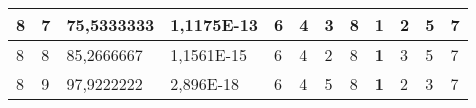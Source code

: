 \documentclass[conference]{IEEEtran}
\begin{document}
\begin{table*}[]
\begin{tabular}{|llll|llllllll|}
\multicolumn{1}{|l|}{8}                                                     & \multicolumn{1}{l|}{7}                                                        & \multicolumn{1}{l|}{75,5333333}                                                   & 1,1175E-13                     & \multicolumn{1}{l|}{6}                                                  & \multicolumn{1}{l|}{4}                                                  & \multicolumn{1}{l|}{3}                                                  & \multicolumn{1}{l|}{8}                                                  & \multicolumn{1}{l|}{\textbf{1}}                                         & \multicolumn{1}{l|}{2}                                                  & \multicolumn{1}{l|}{5}                                                  & 7                          \\ \hline
\multicolumn{1}{|l|}{8}                                                     & \multicolumn{1}{l|}{8}                                                        & \multicolumn{1}{l|}{85,2666667}                                                   & 1,1561E-15                     & \multicolumn{1}{l|}{6}                                                  & \multicolumn{1}{l|}{4}                                                  & \multicolumn{1}{l|}{2}                                                  & \multicolumn{1}{l|}{8}                                                  & \multicolumn{1}{l|}{\textbf{1}}                                         & \multicolumn{1}{l|}{3}                                                  & \multicolumn{1}{l|}{5}                                                  & 7                          \\ \hline
\multicolumn{1}{|l|}{8}                                                     & \multicolumn{1}{l|}{9}                                                        & \multicolumn{1}{l|}{97,9222222}                                                   & 2,896E-18                      & \multicolumn{1}{l|}{6}                                                  & \multicolumn{1}{l|}{4}                                                  & \multicolumn{1}{l|}{5}                                                  & \multicolumn{1}{l|}{8}                                                  & \multicolumn{1}{l|}{\textbf{1}}                                         & \multicolumn{1}{l|}{2}                                                  & \multicolumn{1}{l|}{3}                                                  & 7                          \\ \hline

\end{tabular}
\end{table*}
\end{document}
